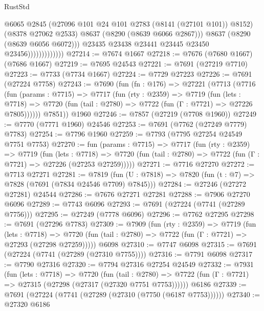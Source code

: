 \begin{lexlean}{RustStd}
\begin{coremodule}
                                  @6065
                                  @2845
                                  (@27096 @101 @24 @101 @2783 (@8141 (@27101 @101)) @8152)
                                  (@8378 @27062 @2533)
                                  @8637
                                  (@8290 (@8639 @6066 @2867)))
                                @8637
                                (@8290 (@8639 @6056 @6072)))
                              @23435
                              @23438
                              @23441
                              @23445
                              @23450
                              @23456)))))))))))))
@27214 := @7674 @1667
@27218 := @7676 (@7680 @1667) (@7686 @1667)
@27219 := @7695 @24543
@27221 := @7691 (@27219 @7710)
@27223 := @7733 (@7734 @1667)
@27224 := @7729 @27223
@27226 := @7691 (@27224 @7758)
@27243 := @7690
    (fun (fn : @176) =>
    @27221
      (@7713
        (@7716
          (fun (params : @7715) =>
          @7717
            (fun (rty : @2359) =>
            @7719
              (fun (lets : @7718) =>
              @7720 (fun (tail : @2780) => @7722 (fun (Γ : @7721) => @27226 @7805))))))
        @7851))
    @1960
@27246 := @7857 (@27219 (@7708 @1960))
@27249 := @7770 (@7771 @1960) @24546
@27253 := @7691 (@7762 (@27249 @7779) @7783)
@27254 := @7796 @1960
@27259 := @7793 (@7795 @27254 @24549 @7751 @7753)
@27270 := fun (params : @7715) =>
  @7717
    (fun (rty : @2359) =>
    @7719
      (fun (lets : @7718) =>
      @7720 (fun (tail : @2780) => @7722 (fun (Γ : @7721) => @27226 (@27253 @27259)))))
@27271 := @7716 @27270
@27272 := @7713 @27271
@27281 := @7819
    (fun (U : @7818) => @7820 (fun (t : @7) => @7828 (@7691 (@7834 @24546 @7709) @7845)))
@27284 := @27246 (@27272 @27281) @24544
@27286 := @7676 @27271 @27281
@27288 := @7906 @27270 @6096
@27289 := @7743 @6096
@27293 := @7691 (@27224 (@7741 (@27289 @7756)))
@27295 := @27249 (@7778 @6096)
@27296 := @7762 @27295
@27298 := @7691 (@27296 @7783)
@27309 := @7909
    (fun (rty : @2359) =>
    @7719
      (fun (lets : @7718) =>
      @7720 (fun (tail : @2780) => @7722 (fun (Γ : @7721) => @27293 (@27298 @27259)))))
    @6098
@27310 := @7747 @6098
@27315 := @7691 (@27224 (@7741 (@27289 (@27310 @7755))))
@27316 := @7791 @6098
@27317 := @7790 @27316
@27320 := @7794 @27316 @27254 @24549
@27332 := @7931
    (fun (lets : @7718) =>
    @7720
      (fun (tail : @2780) =>
      @7722 (fun (Γ : @7721) => @27315 (@27298 (@27317 (@27320 @7751 @7753))))))
    @6186
@27339 := @7691 (@27224 (@7741 (@27289 (@27310 (@7750 (@6187 @7753))))))
@27340 := @27320 @6186

\end{coremodule}
\end{lexlean}
